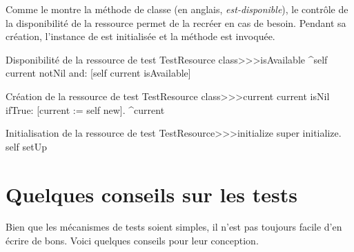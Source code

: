 \documentclass[a4paper,10pt,twoside]{book}
\begin{document}
{Comme le montre la méthode de classe  
(en anglais, \emph{est-disponible}), le contrôle de la disponibilité de la ressource permet 
de la recréer en cas de besoin. Pendant sa création, l'instance de  est 
initialisée et la méthode  est invoquée.


\begin{method}[testresourceisavailable]{Disponibilité de la ressource de test}
TestResource class>>>isAvailable
	^self current notNil and: [self current isAvailable]
\end{method}
\begin{method}[testresourcecurrent]{Création de la ressource de test}
TestResource class>>>current
	current isNil ifTrue: [current := self new].
	^current
\end{method}
\begin{method}[restresourceinitialize]{Initialisation de la ressource de test}
TestResource>>>initialize
  super initialize.
	self setUp
\end{method}

\section{Quelques conseils sur les tests}

Bien que les mécanismes de tests soient simples, il n'est pas toujours
facile d'en écrire de bons.
Voici quelques conseils pour leur conception.

\begin{description}



\end{description}}
\end{document}

